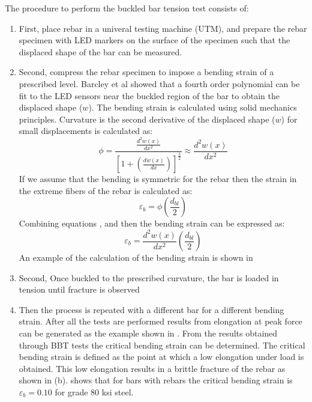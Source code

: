 The procedure to perform the buckled bar tension test consists of:

\begin{enumerate}
    \item First, place rebar in a univeral testing machine (UTM), and prepare the rebar specimen with LED markers on the surface of the specimen such that the displaced shape of the bar can be measured.
    \item Second, compress the rebar specimen to impose a bending strain of a prescribed level. Barcley et al showed that a fourth order polynomial can be fit to the LED sensors near the buckled region of the bar to obtain the displaced shape ($w$). The bending strain is calculated using solid mechanics principles. Curvature is the second derivative of the displaced shape ($w$) for small displacements is calculated as: 
    \begin{equation}
        \phi=\frac{\frac{d^2w(x)}{dx^2}}{\left[1+\left(\frac{dw(x)}{dx}\right)\right]^\frac{3}{2}}\approx \frac{d^2w(x)}{dx^2}
        \label{eq.CuvatureAprox}
    \end{equation}
    If we assume that the bending is symmetric for the rebar then the strain in the extreme fibers of the rebar is calculated as:
    \begin{equation}
        \varepsilon_{b}=\phi\left(\frac{d_{bl}}{2}\right) 
        \label{eq.BendingStrain}
    \end{equation}    
    Combining equations , and  then the bending strain can be expressed as:
    \begin{equation}
        \varepsilon_{b}=\frac{d^2w(x)}{dx^2}\left(\frac{d_{bl}}{2}\right) 
        \label{eq.BendingStrainExpanded}
    \end{equation}
    An example of the calculation of the bending strain is shown in 
    \item Second, Once buckled to the prescribed curvature, the bar is loaded in tension until fracture is observed
    \item Then the process is repeated with a different bar for a different bending strain. After all the tests are performed results from elongation at peak force can be generated as the example shown in . From the results obtained through BBT tests the critical bending strain can be determined. The critical bending strain is defined as the point at which a low elongation under load is obtained. This low elongation results in a brittle fracture of the rebar as shown in (b).  shows that for bars with rebars the critical bending strain is $\varepsilon_{b}=0.10$ for grade 80 ksi steel.
\end{enumerate}

